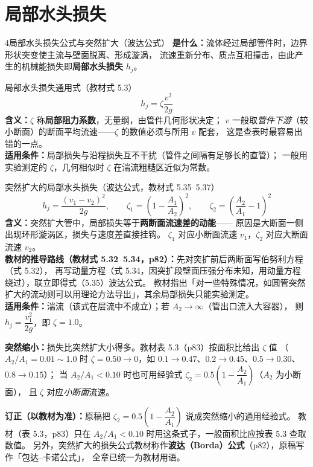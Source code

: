 \section{局部水头损失}

\begin{kaodian}{4}{局部水头损失公式与突然扩大（波达公式）}
\textbf{是什么：}流体经过局部管件时，边界形状突变使主流与壁面脱离、形成漩涡，
流速重新分布、质点互相撞击，由此产生的机械能损失即\textbf{局部水头损失} $h_j$。

\begin{gongshi}{局部水头损失通用式（教材式 5.3）}
\[ h_j=\zeta\frac{v^2}{2g} \]
\textbf{含义：}$\zeta$ 称\textbf{局部阻力系数}，无量纲，由管件几何形状决定；
$v$ 一般取\emph{管件下游}（较小断面）的断面平均流速——$\zeta$ 的数值必须与所用 $v$ 配套，
这是查表时最容易出错的一点。\\
\textbf{适用条件：}局部损失与沿程损失互不干扰（管件之间隔有足够长的直管）；
一般用实验测定的 $\zeta$，几何相似时 $\zeta$ 在湍流粗糙区近似为常数。
\end{gongshi}

\begin{gongshi}{突然扩大的局部水头损失（波达公式，教材式 5.35~5.37）}
\[ h_j=\frac{\left(v_1-v_2\right)^2}{2g},\qquad
   \zeta_1=\left(1-\frac{A_1}{A_2}\right)^2,\qquad
   \zeta_2=\left(\frac{A_2}{A_1}-1\right)^2 \]
\textbf{含义：}突然扩大管中，局部损失等于\textbf{两断面流速差的动能}——
原因是大断面一侧出现环形漩涡区，损失与速度差直接挂钩。
$\zeta_1$ 对应小断面流速 $v_1$，$\zeta_2$ 对应大断面流速 $v_2$。\\
\textbf{教材的推导路线（教材式 5.32~5.34，p82）：}先对突扩前后两断面写伯努利方程（式 5.32），
再写动量方程（式 5.34，因突扩段壁面压强分布未知，用动量方程绕过），联立即得式（5.35）波达公式。
教材指出「对一些特殊情况，如圆管突然扩大的流动则可以用理论方法导出」，其余局部损失只能实验测定。\\
\textbf{适用条件：}湍流（该式在层流中不成立）；若 $A_2\to\infty$（管出口流入大容器），
则 $h_j=\dfrac{v_1^2}{2g}$，即 $\zeta=1.0$。
\end{gongshi}

\textbf{突然缩小：}损失比突然扩大小得多。教材表 5.3（p83）按面积比给出 $\zeta$ 值
（$A_2/A_1=0.01\sim1.0$ 时 $\zeta=0.50\to0$，如 $0.1\to0.47$、$0.2\to0.45$、$0.5\to0.30$、$0.8\to0.15$）；
当 $A_2/A_1<0.10$ 时也可用经验式 $\zeta_2=0.5\left(1-\dfrac{A_2}{A_1}\right)$（$A_2$ 为小断面），
且 $\zeta$ 对应\emph{小断面}流速。

\begin{tishi}
\textbf{订正（以教材为准）：}原稿把 $\zeta_2=0.5\left(1-\dfrac{A_2}{A_1}\right)$ 说成突然缩小的通用经验式。
教材（表 5.3，p83）只在 $A_2/A_1<0.10$ 时用这条式子，一般面积比应按表 5.3 查取数值。
另外，突然扩大的损失公式教材称作\textbf{波达（Borda）公式}（p82），原稿写作「包达--卡诺公式」，
全章已统一为教材用语。
\end{tishi}


\end{kaodian}
